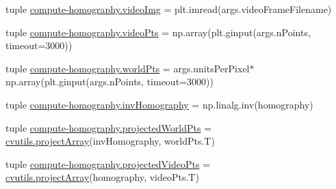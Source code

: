 \begin{DoxyCompactItemize}
\item 
tuple \hyperlink{namespacecompute-homography_a538236bfe84281da94240c6ae34c38fd}{compute-\/homography.\-video\-Img} = plt.\-imread(args.\-video\-Frame\-Filename)
\item 
tuple \hyperlink{namespacecompute-homography_a7240dfc7b627ad67fff9b95427cecd5a}{compute-\/homography.\-video\-Pts} = np.\-array(plt.\-ginput(args.\-n\-Points, timeout=3000))
\item 
tuple \hyperlink{namespacecompute-homography_adf35b7c6d4b52afb65b2363d44565358}{compute-\/homography.\-world\-Pts} = args.\-units\-Per\-Pixel$\ast$np.\-array(plt.\-ginput(args.\-n\-Points, timeout=3000))
\item 
tuple \hyperlink{namespacecompute-homography_a2c67d96c0e3aacf652dd2737540a3aa9}{compute-\/homography.\-inv\-Homography} = np.\-linalg.\-inv(homography)
\item 
tuple \hyperlink{namespacecompute-homography_a2bef6977b46ae10e4de60341d387d4c2}{compute-\/homography.\-projected\-World\-Pts} = \hyperlink{namespacecvutils_a0ec21be4fe1491cec23252672d90564c}{cvutils.\-project\-Array}(inv\-Homography, world\-Pts.\-T)
\item 
tuple \hyperlink{namespacecompute-homography_a39f7af0562dd06b5fc283541e160732b}{compute-\/homography.\-projected\-Video\-Pts} = \hyperlink{namespacecvutils_a0ec21be4fe1491cec23252672d90564c}{cvutils.\-project\-Array}(homography, video\-Pts.\-T)
\end{DoxyCompactItemize}
